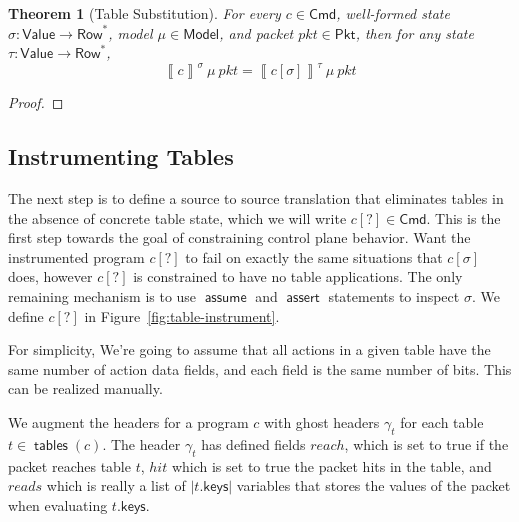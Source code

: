 \documentclass{article}
\newcommand{\pkt}{\mathit{pkt}}
\newcommand{\denote}[1]{\left\llbracket#1\right\rrbracket}
\newcommand{\Value}{\mathsf{Value}}
\newcommand{\Cmd}{\mathsf{Cmd}}
\newcommand{\Pkt}{\mathsf{Pkt}}
\newcommand{\Model}{\mathsf{Model}}
\newcommand{\Row}{\mathsf{Row}}
\newcommand{\keys}{\mathsf{keys}}
\newcommand{\reach}{\mathit{\mathit{reach}}}
\newcommand{\hit}{\mathit{hit}}
\newcommand{\reads}{\mathit{reads}}
\newcommand{\assert}{\mathop{\mathsf{assert}}}
\newcommand{\assume}{\mathop{\mathsf{assume}}}
\newcommand{\tables}{\mathop{\mathsf{tables}}}
\newtheorem{theorem}{Theorem}
\begin{document}
\begin{theorem}[Table Substitution]
  For every $c \in \Cmd$, well-formed state $\sigma : \Value \to \Row^*$, model
  $\mu \in \Model$, and packet $\pkt \in \Pkt$, then for any state $\tau :
  \Value \to \Row^*$,
  \[\denote{c}^\sigma~\mu~\pkt = \denote{c[\sigma]}^\tau~\mu~\pkt\]
\end{theorem}
\begin{proof}
\end{proof}


\subsection{Instrumenting Tables}

The next step is to define a source to source translation that eliminates tables
in the absence of concrete table state, which we will write $c[?] \in \Cmd$.
This is the first step towards the goal of constraining control plane behavior.
Want the instrumented program $c[?]$ to fail on exactly the same situations that
$c[\sigma]$ does, however $c[?]$ is constrained to have no table applications.
The only remaining mechanism is to use $\assume$ and $\assert$ statements to
inspect $\sigma$. We define $c[?]$ in Figure~\ref{fig:table-instrument}.

For simplicity, We're going to assume that all actions in a given table have the
same number of action data fields, and each field is the same number of bits.
This can be realized manually.

We augment the headers for a program $c$ with ghost headers $\gamma_t$ for each
table $t \in \tables(c)$. The header $\gamma_t$ has defined fields
$\reach$, which is set to true if the packet reaches table $t$,
$\hit$ which is set to true the packet hits in the table, and
$\reads$ which is really a list of $|t.\keys|$ variables that stores the
values of the packet when evaluating $t.\keys$.
\end{document}
